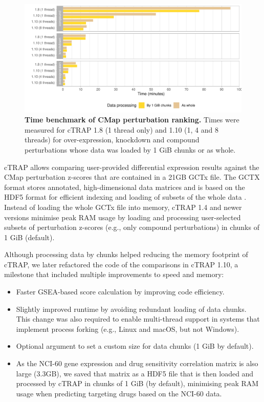 \begin{figure}[!b]
  \includegraphics[width=\textwidth]{images/ctrap/ranking-time}
  \centering
  \caption[Time benchmark of CMap perturbation ranking]{\textbf{Time benchmark of CMap perturbation ranking.} Times were measured for cTRAP 1.8 (1 thread only) and 1.10 (1, 4 and 8 threads) for over-expression, knockdown and compound perturbations whose data was loaded by 1 GiB chunks or as whole.}
  \label{fig:cmap-ranking-time}
\end{figure}

cTRAP allows comparing user-provided differential expression results against the CMap perturbation z-scores that are contained in a 21GB GCTx file. The GCTX format stores annotated, high-dimensional data matrices and is based on the HDF5 format for efficient indexing and loading of subsets of the whole data \cite{enache:2018wq}. Instead of loading the whole GCTx file into memory, cTRAP 1.4 and newer versions minimise peak RAM usage by loading and processing user-selected subsets of perturbation z-scores (e.g., only compound perturbations) in chunks of 1 GiB (default).

Although processing data by chunks helped reducing the memory footprint of cTRAP, we later refactored the code of the comparisons in cTRAP 1.10, a milestone that included multiple improvements to speed and memory:

\begin{itemize}
	\item Faster GSEA-based score calculation by improving code efficiency.
	\item Slightly improved runtime by avoiding redundant loading of data chunks. This change was also required to enable multi-thread support in systems that implement process forking (e.g., Linux and macOS, but not Windows).
	\item Optional argument to set a custom size for data chunks (1 GiB by default).
	\item As the NCI-60 gene expression and drug sensitivity correlation matrix is also large (3.3GB), we saved that matrix as a HDF5 file that is then loaded and processed by cTRAP in chunks of 1 GiB (by default), minimising peak RAM usage when predicting targeting drugs based on the NCI-60 data.
\end{itemize}

